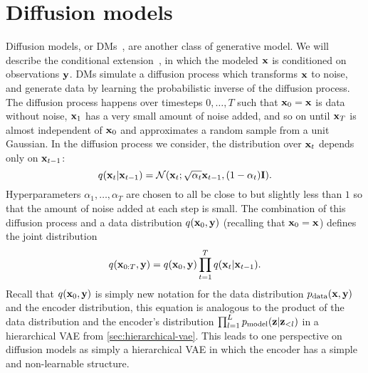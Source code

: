 \section{Diffusion models}
\label{sec:dm}
Diffusion models, or DMs~\citep{sohl2015deep,ho2020denoising,nichol2021improved,song2020score}, are another class of generative model. We will describe the conditional extension~\citep{tashiro2021csdi}, in which the modeled ${\mathbf{x}}$ is conditioned on observations ${\mathbf{y}}$. DMs simulate a diffusion process which transforms ${\mathbf{x}}$ to noise, and generate data by learning the probabilistic inverse of the diffusion process. The diffusion process happens over timesteps $0,\ldots,T$ such that ${\mathbf{x}}_0={\mathbf{x}}$ is data without noise, ${\mathbf{x}}_1$ has a very small amount of noise added, and so on until ${\mathbf{x}}_T$ is almost independent of ${\mathbf{x}}_0$ and approximates a random sample from a unit Gaussian. In the diffusion process we consider, the distribution over ${\mathbf{x}}_t$ depends only on ${\mathbf{x}}_{t-1}$:
\begin{equation} \label{eq:q-step}
    q({\mathbf{x}}_t | {\mathbf{x}}_{t-1}) = {\mathcal{N}}({\mathbf{x}}_t ; \sqrt{\alpha_t}  {\mathbf{x}}_{t-1} , (1-\alpha_t) {\mathbf{I}} ).
\end{equation}
Hyperparameters $\alpha_1,\ldots,\alpha_T$ are chosen to all be close to but slightly less than $1$ so that the amount of noise added at each step is small.
The combination of this diffusion process and a data distribution $q({\mathbf{x}}_0,{\mathbf{y}})$ (recalling that ${\mathbf{x}}_0={\mathbf{x}}$) defines the joint distribution
\begin{equation} \label{eq:q-joint}
    q({\mathbf{x}}_{0:T}, {\mathbf{y}}) = q({\mathbf{x}}_0, {\mathbf{y}}) \prod_{t=1}^T q({\mathbf{x}}_t|{\mathbf{x}}_{t-1}).
\end{equation}
Recall that $q({\mathbf{x}}_0, {\mathbf{y}})$ is simply new notation for the data distribution $p_{\rm{data}}({\mathbf{x}},{\mathbf{y}})$ and the encoder distribution, this equation is analogous to the product of the data distribution and the encoder's distribution
$\prod_{l=1}^L p_{\rm{model}}({\mathbf{z}}|{\mathbf{z}}_{<l})$ in a hierarchical VAE from \cref{sec:hierarchical-vae}. This leads to one perspective on diffusion models as simply a hierarchical VAE in which the encoder has a simple and non-learnable structure.

